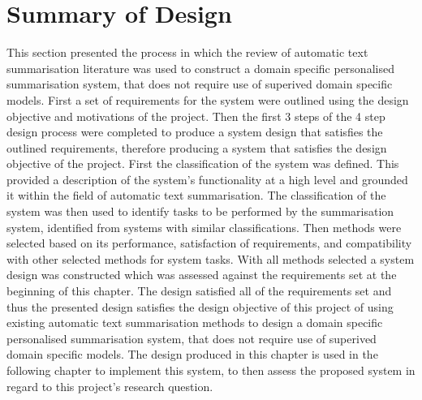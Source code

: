 \section{Summary of Design}
This section presented the process in which the review of automatic text summarisation literature was used to construct a domain specific personalised summarisation system, that does not require use of superived domain specific models. First a set of requirements for the system were outlined using the design objective and motivations of the project. Then the first 3 steps of the 4 step design process were completed to produce a system design that satisfies the outlined requirements, therefore producing a system that satisfies the design objective of the project.  First the classification of the system was defined. This provided a description of the  system’s functionality at a high level and grounded it within the field of automatic text summarisation. The classification of the system was then used to identify tasks to be performed by the summarisation system, identified from systems with similar classifications. Then methods were selected based on its performance, satisfaction of requirements, and compatibility with other selected methods for system tasks. With all methods selected a system design was constructed which was assessed against the requirements set at the beginning of this chapter. The design satisfied all of the requirements set and thus the presented design satisfies the design objective of this project of using existing automatic text summarisation methods to design a domain specific personalised summarisation system, that does not require use of superived domain specific models. The design produced in this chapter is used in the following chapter to implement this system, to then assess the proposed system in regard to this project's research question.